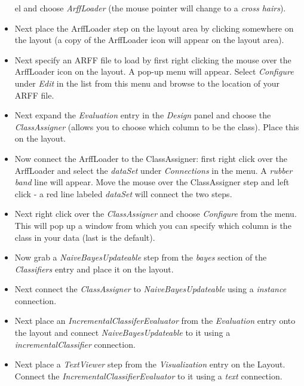 \begin{itemize}
el and choose \textit{ArffLoader} (the mouse pointer will
          change to a \textit{cross hairs}).

	\item Next place the ArffLoader step on the layout area by clicking
	somewhere on the layout (a copy of the ArffLoader icon will appear on
	the layout area).

	\item Next specify an ARFF file to load by first right clicking the mouse
	over the ArffLoader icon on the layout. A pop-up menu will
	appear. Select \textit{Configure} under \textit{Edit} in the list from this menu and
	browse to the location of your ARFF file.

	\item Next expand the \textit{Evaluation} entry in the
          \textit{Design} panel and choose the \textit{ClassAssigner}
          (allows you to choose which column to be the class). Place
          this on the layout.

	\item Now connect the ArffLoader to the ClassAssigner: first right click
	over the ArffLoader and select the \textit{dataSet} under \textit{Connections} in
	the menu. A \textit{rubber band} line will appear. Move the mouse over the
	ClassAssigner step and left click - a red line labeled \textit{dataSet}
	will connect the two steps.

	\item Next right click over the \textit{ClassAssigner} and choose \textit{Configure} from
	the menu. This will pop up a window from which you can specify which
	column is the class in your data (last is the default).

        \item Now grab a \textit{NaiveBayesUpdateable} step from the \textit{bayes}
        section of the \textit{Classifiers} entry and place it on the layout.

        \item Next connect the \textit{ClassAssigner} to \textit{NaiveBayesUpdateable}
        using a \textit{instance} connection.

        \item Next place an \textit{IncrementalClassiferEvaluator} from the \textit{Evaluation}
        entry onto the layout and connect \textit{NaiveBayesUpdateable} to it using a
        \textit{incrementalClassifier} connection.

        \item Next place a \textit{TextViewer} step from the \textit{Visualization}
        entry on the Layout. Connect the \textit{IncrementalClassifierEvaluator} to
        it using a \textit{text} connection.


\end{itemize}
